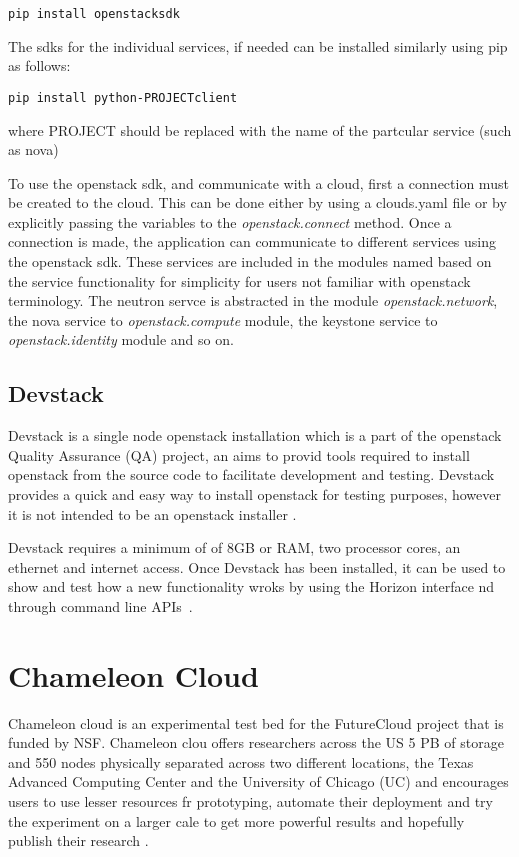 \begin{verbatim}
pip install openstacksdk
\end{verbatim}

The sdks for the individual services, if needed can be installed
similarly using pip as follows:

\begin{verbatim}
pip install python-PROJECTclient
\end{verbatim}

where PROJECT should be replaced with the name of the partcular
service (such as nova)

To use the openstack sdk, and communicate with a cloud, first a
connection must be created to the cloud. This can be done either by
using a clouds.yaml file or by explicitly passing the variables to
the \emph{openstack.connect\(\)} method. Once a connection is made, the
application can communicate to different services using the openstack
sdk. These services are included in the modules named based on the
service functionality for simplicity for users not familiar with
openstack terminology. The neutron servce is abstracted in the
module \emph{openstack.network}, the nova service
to \emph{openstack.compute} module, the keystone service
to \emph{openstack.identity} module and so on.

\subsection{Devstack}
Devstack is a single node openstack installation which is a part of
the openstack Quality Assurance (QA) project, an aims to provid tools
required to install openstack from the source code to facilitate
development and testing. Devstack provides a quick and easy way to
install openstack for testing purposes, however it is not intended to
be an openstack installer
\cite{hid-sp18-503-devstack}.

Devstack requires a minimum of of 8GB or RAM, two processor cores, an
ethernet and internet access. Once Devstack has been installed, it can
be used to show and test how a new functionality wroks by using the
Horizon interface nd through command line
APIs~\cite{hid-sp18-503-devstack}.

\section{Chameleon Cloud}
Chameleon cloud is an experimental test bed for the FutureCloud
project that is funded by NSF. Chameleon clou offers researchers
across the US 5 PB of storage and 550 nodes physically separated
across two different locations, the Texas Advanced Computing Center
and the University of Chicago (UC) and encourages users to use lesser
resources fr prototyping, automate their deployment and try the
experiment on a larger cale to get more powerful results and hopefully
publish their research
\cite{hid-sp18-503-handbook}.

